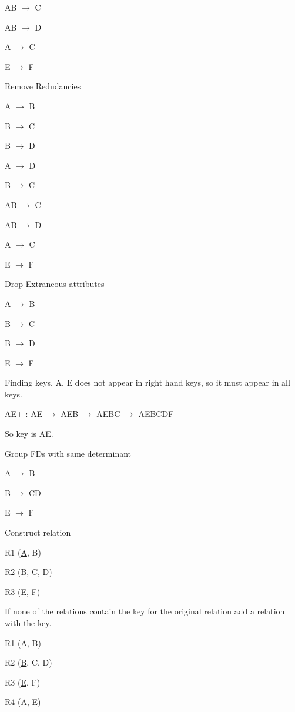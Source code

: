 \documentclass[12pt]{article}
\begin{document}
\begin{enumerate}
\begin{enumerate}
AB $\rightarrow$ C

AB $\rightarrow$ D

A $\rightarrow$ C

E $\rightarrow$ F

\hrulefill

Remove Redudancies

A $\rightarrow$ B

B $\rightarrow$ C

B $\rightarrow$ D

A $\rightarrow$ D

B $\rightarrow$ C

AB $\rightarrow$ C

AB $\rightarrow$ D

A $\rightarrow$ C

E $\rightarrow$ F

\hrulefill

Drop Extraneous attributes

A $\rightarrow$ B

B $\rightarrow$ C

B $\rightarrow$ D

E $\rightarrow$ F

\hrulefill

Finding keys. A, E does not appear in right hand keys, so it must appear in all keys.

AE+ : AE $\rightarrow$ AEB $\rightarrow$ AEBC  $\rightarrow$ AEBCDF

So key is AE. 

\hrulefill

Group FDs with same determinant

A $\rightarrow$ B

B $\rightarrow$ CD

E $\rightarrow$ F

\hrulefill

Construct relation 

R1 (\underline{A}, B)

R2 (\underline{B}, C, D)

R3 (\underline{E}, F)


\hrulefill

If none of the relations contain the key for the original relation add a relation with the key.

R1 (\underline{A}, B)

R2 (\underline{B}, C, D)

R3 (\underline{E}, F)

R4 (\underline{A}, \underline{E})



\end{enumerate}
\end{enumerate}
\end{document}
